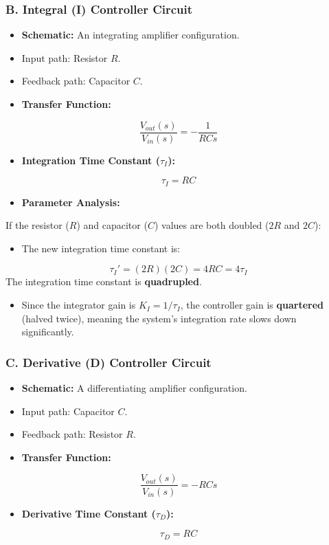 \subsubsection{B. Integral (I) Controller Circuit}
\begin{itemize}
  \item \textbf{Schematic:} An integrating amplifier configuration.
  \item Input path: Resistor $R$.
  \item Feedback path: Capacitor $C$.
  \item \textbf{Transfer Function:}
\end{itemize}
  \[ \frac{V_{out}(s)}{V_{in}(s)} = -\frac{1}{R C s} \]
\begin{itemize}
  \item \textbf{Integration Time Constant ($\tau_I$):}
\end{itemize}
  \[ \tau_I = R C \]
\begin{itemize}
  \item \textbf{Parameter Analysis:}
\end{itemize}
  If the resistor ($R$) and capacitor ($C$) values are both doubled ($2R$ and $2C$):
\begin{itemize}
  \item The new integration time constant is:
\end{itemize}
    \[ \tau_I' = (2R)(2C) = 4RC = 4\tau_I \]
    The integration time constant is \textbf{quadrupled}.
\begin{itemize}
  \item Since the integrator gain is $K_I = 1/\tau_I$, the controller gain is \textbf{quartered} (halved twice), meaning the system's integration rate slows down significantly.
\end{itemize}

\subsubsection{C. Derivative (D) Controller Circuit}
\begin{itemize}
  \item \textbf{Schematic:} A differentiating amplifier configuration.
  \item Input path: Capacitor $C$.
  \item Feedback path: Resistor $R$.
  \item \textbf{Transfer Function:}
\end{itemize}
  \[ \frac{V_{out}(s)}{V_{in}(s)} = -R C s \]
\begin{itemize}
  \item \textbf{Derivative Time Constant ($\tau_D$):}
\end{itemize}
  \[ \tau_D = R C \]

